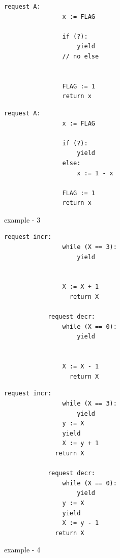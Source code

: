 \noindent
\begin{minipage}[t]{0.45\textwidth}
	\begin{lstlisting}[caption={Not serializable: {(A,0),(A,0)}},
	label={lst:BasicNonSer}]
			request A: 
			    x := FLAG 
			
			    if (?): 
			        yield
			    // no else
			
			
			    FLAG := 1 
			    return x
		\end{lstlisting}
\end{minipage}%
\hfill
\begin{minipage}[t]{0.45\textwidth}
	\begin{lstlisting}[caption={Serializable},
		label={lst:BasicSer}]
			request A: 
			    x := FLAG
			
			    if (?):
			        yield
			    else:
			        x := 1 - x
			
			    FLAG := 1
			    return x
		\end{lstlisting}
\end{minipage}

\vspace{2em}
example - 3

\noindent
\begin{minipage}[t]{0.45\textwidth}
	\begin{lstlisting}[caption={Fred (serializable)}]
			request incr: 
			    while (X == 3):
			        yield
			        
			        
			    X := X + 1
				  return X		
			
			request decr: 
			    while (X == 0): 
			        yield
			        
			        
			    X := X - 1
				  return X
		\end{lstlisting}
\end{minipage}
\hfill
\begin{minipage}[t]{0.45\textwidth}
	\begin{lstlisting}[caption={Fred2 (not serializable)}]
			request incr:
			    while (X == 3):
			        yield
			    y := X
			    yield
			    X := y + 1
		      return X		
			
			request decr: 
			    while (X == 0):
			        yield
			    y := X
			    yield
			    X := y - 1
		      return X
		\end{lstlisting}
\end{minipage}
	
\newpage

example - 4


